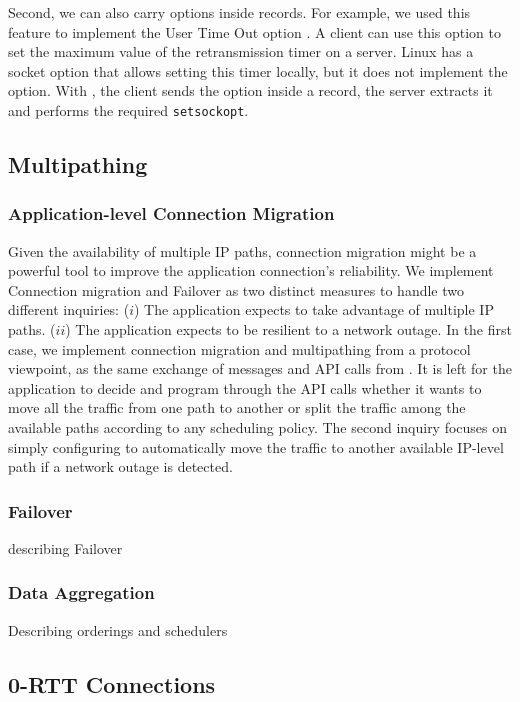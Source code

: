 Second, we can also carry \tcp options inside \tls records. For example, we used
this feature to implement the \tcp User Time Out option \cite{rfc5482}. A client
can use this option to set the maximum value of the retransmission
timer on a server. Linux \tcp has a socket option that allows setting
this timer locally, but it does not implement the option. With \tcpls, the client sends the option inside a \tls record, the server extracts it
and performs the required \texttt{setsockopt}.

\subsection{Multipathing}

\subsubsection{Application-level Connection Migration}
\label{sec:connmigr}

Given the availability of multiple IP paths, connection migration might be a
powerful tool to improve the application connection's reliability.  We implement Connection migration and Failover as two distinct measures to handle
two different inquiries: ($i$) The application expects to take advantage of multiple IP paths. ($ii$) The application expects to be resilient to a network outage. In the first case, we implement connection migration and multipathing from a protocol viewpoint, as the same exchange of messages and API calls from \tcpls. It is left for the application to decide and program
through the API calls whether it wants to move all the traffic from one path to
another or split the traffic among the available paths according to any
scheduling policy. The second inquiry focuses on simply configuring \tcpls to automatically move the traffic to another available IP-level path if a network outage is detected.


\subsubsection{Failover}\label{failover}
describing Failover

\subsubsection{Data Aggregation}
Describing orderings and schedulers

\subsection{0-RTT Connections}
